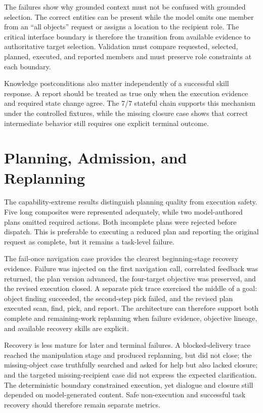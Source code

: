 The failures show why grounded context must not be confused with grounded selection. The correct entities can be present while the model omits one member from an \enquote{all objects} request or assigns a location to the recipient role. The critical interface boundary is therefore the transition from available evidence to authoritative target selection. Validation must compare requested, selected, planned, executed, and reported members and must preserve role constraints at each boundary.

Knowledge postconditions also matter independently of a successful skill response. A report should be treated as true only when the execution evidence and required state change agree. The 7/7 stateful chain supports this mechanism under the controlled fixtures, while the missing closure case shows that correct intermediate behavior still requires one explicit terminal outcome.

\section{Planning, Admission, and Replanning}

The capability-extreme results distinguish planning quality from execution safety. Five long composites were represented adequately, while two model-authored plans omitted required actions. Both incomplete plans were rejected before dispatch. This is preferable to executing a reduced plan and reporting the original request as complete, but it remains a task-level failure.

The fail-once navigation case provides the clearest beginning-stage recovery evidence. Failure was injected on the first navigation call, correlated feedback was returned, the plan version advanced, the four-target objective was preserved, and the revised execution closed. A separate pick trace exercised the middle of a goal: object finding succeeded, the second-step pick failed, and the revised plan executed scan, find, pick, and report. The architecture can therefore support both complete and remaining-work replanning when failure evidence, objective lineage, and available recovery skills are explicit.

Recovery is less mature for later and terminal failures. A blocked-delivery trace reached the manipulation stage and produced replanning, but did not close; the missing-object case truthfully searched and asked for help but also lacked closure; and the targeted missing-recipient case did not express the expected clarification. The deterministic boundary constrained execution, yet dialogue and closure still depended on model-generated content. Safe non-execution and successful task recovery should therefore remain separate metrics.

